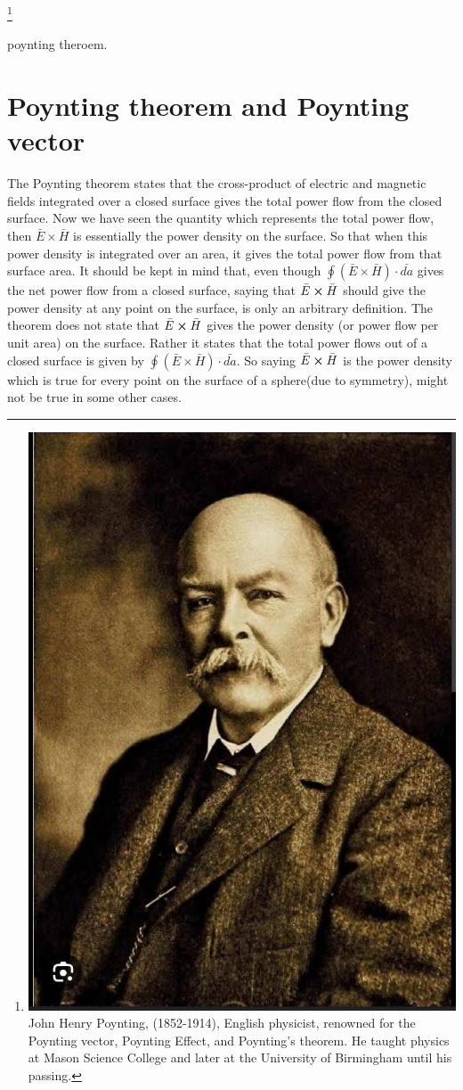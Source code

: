 \footnote{
\includegraphics[scale=0.04]{graphics/poynting}
John Henry Poynting, (1852-1914), English physicist, renowned for the Poynting vector, Poynting Effect, and Poynting's theorem. He taught physics at Mason Science College and later at the University of Birmingham until his passing.
}

poynting theroem. 
\section{Poynting theorem and Poynting vector}
The Poynting theorem states that the cross-product of electric and magnetic fields integrated over a closed surface gives the total power flow from the closed surface. Now we have seen the quantity which represents the total power flow, then $\bar{E}\times\bar{H}$ is essentially the power density on the surface. So that when this power density is integrated over an area, it gives the total power flow from that surface area.
It should be kept in mind that, even though $ \oint(\bar{E}\times\bar{H})\cdot\bar{da} $ gives the net power flow from a closed surface, saying that $\bar{E}\cross\bar{H}$ should give the power density at any point on the surface, is only an arbitrary definition. The theorem does not state that $\bar{E}\cross\bar{H}$ gives the power density (or power flow per unit area) on the surface. Rather it states that the total power flows out of a closed surface is given by $ \oint(\bar{E}\times\bar{H})\cdot\bar{da} $. So saying $\bar{E}\cross\bar{H}$ is the power density which is true for every point on the surface of a sphere(due to symmetry), might not be true in some other cases.

